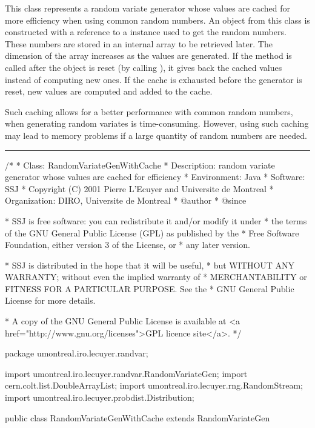 
This class represents a random variate generator whose values
are cached for more efficiency when using
common random numbers.  An object
from this class is constructed with a reference to a
 instance used to
get the random numbers.  These numbers
are stored in an internal array to be retrieved later.
The dimension of the array increases as the values
are generated.
If the  method is called after
the object is reset (by calling 
), it gives back the cached
values instead of computing new ones.
If the cache is exhausted before the generator is reset,
new values are computed and added to the cache.

Such caching allows for a better performance with
common random numbers, when
generating random variates is time-consuming.
However, using such caching may lead to memory problems if
a large quantity of random numbers are needed.

\bigskip\hrule

\begin{code}
\begin{hide}
/*
 * Class:        RandomVariateGenWithCache
 * Description:  random variate generator whose values are cached for efficiency
 * Environment:  Java
 * Software:     SSJ 
 * Copyright (C) 2001  Pierre L'Ecuyer and Universite de Montreal
 * Organization: DIRO, Universite de Montreal
 * @author       
 * @since

 * SSJ is free software: you can redistribute it and/or modify it under
 * the terms of the GNU General Public License (GPL) as published by the
 * Free Software Foundation, either version 3 of the License, or
 * any later version.

 * SSJ is distributed in the hope that it will be useful,
 * but WITHOUT ANY WARRANTY; without even the implied warranty of
 * MERCHANTABILITY or FITNESS FOR A PARTICULAR PURPOSE.  See the
 * GNU General Public License for more details.

 * A copy of the GNU General Public License is available at
   <a href="http://www.gnu.org/licenses">GPL licence site</a>.
 */
\end{hide}
package umontreal.iro.lecuyer.randvar;\begin{hide}

import umontreal.iro.lecuyer.randvar.RandomVariateGen;
import cern.colt.list.DoubleArrayList;
import umontreal.iro.lecuyer.rng.RandomStream;
import umontreal.iro.lecuyer.probdist.Distribution;
\end{hide}

public class RandomVariateGenWithCache extends RandomVariateGen\begin{hide} {
   private RandomVariateGen rvg;
   private DoubleArrayList values;
   private int index = 0;
   private boolean caching = true;
\end{hide}
\end{code}

